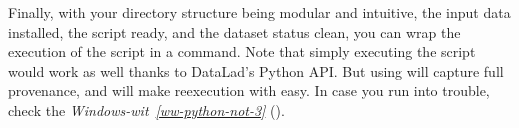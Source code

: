 \sphinxAtStartPar
Finally, with your directory structure being modular and intuitive,
the input data installed, the script ready, and the dataset status clean,
you can wrap the execution of the script in a  command. Note that
simply executing the script would work as well \textendash{} thanks to DataLad’s Python API.
But using  will capture full provenance, and will make
re\sphinxhyphen{}execution with  easy.
In case you run into trouble, check the \textit{Windows-wit}~{\windowswiticoninline}\textit{\ref{ww-python-not-3}} {\hyperref[\detokenize{basics/101-130-yodaproject:ww-python-not-3}]{}} ().
